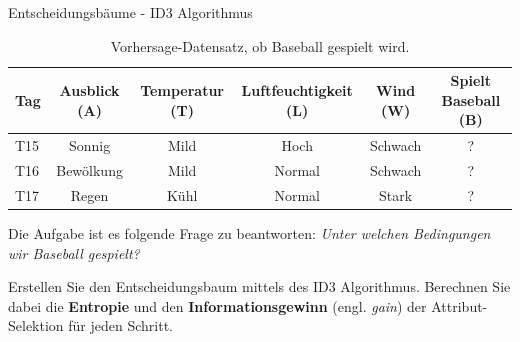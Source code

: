 \begin{task}[credit=16]{Entscheidungsbäume - ID3 Algorithmus}
\begin{table}[h!]
\centering
\caption{Vorhersage-Datensatz, ob Baseball gespielt wird.}
\label{tab:data_baseball_predict}
\begin{tabular}{l|c|c|c|c|c}
\toprule
\textbf{Tag} & \textbf{Ausblick (A)} & \textbf{Temperatur (T)}  & \textbf{Luftfeuchtigkeit (L)} & \textbf{Wind (W)}     & \textbf{Spielt Baseball (B)} \\
\midrule
T15 & Sonnig    & Mild        & Hoch     & Schwach & ?       \\
T16 & Bewölkung & Mild        & Normal   & Schwach & ?       \\
T17 & Regen     & Kühl        & Normal   & Stark   & ?       \\
\bottomrule
\end{tabular}
\end{table}

Die Aufgabe ist es folgende Frage zu beantworten: \textit{Unter welchen Bedingungen wir Baseball gespielt?}

\begin{subtask}[points=10,title=ID3 Algorithmus]
\label{q:id3_alg}
Erstellen Sie den Entscheidungsbaum mittels des ID3 Algorithmus.
Berechnen Sie dabei die \textbf{Entropie} und den \textbf{Informationsgewinn} (engl. \textit{gain}) der Attribut-Selektion für jeden Schritt.


\end{subtask}
\end{task}
